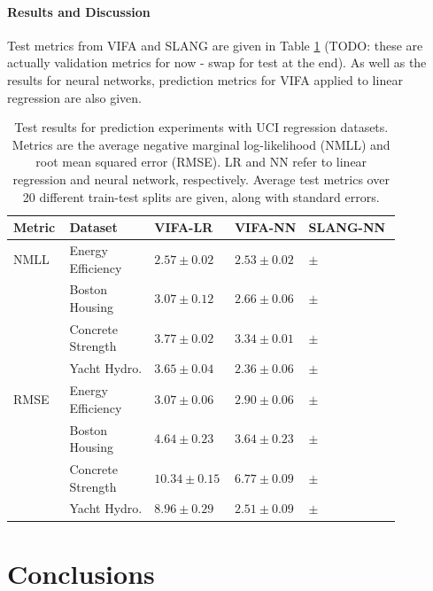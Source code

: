 \documentclass[msc,deptreport.inf]{infthesis} %
\begin{document}
\subsubsection{Results and Discussion} 

Test metrics from VIFA and SLANG are given in Table \ref{table:neural_nets_uci} (TODO: these are actually validation metrics for now - swap for test at the end). As well as the results for neural networks, prediction metrics for VIFA applied to linear regression are also given. 

\begin{table}[h!]
	\begin{center}
		\begin{tabular}{|| p{0.13\linewidth} p{0.21\linewidth} p{0.15\linewidth} p{0.15\linewidth} p{0.23\linewidth} ||} 
 			\hline
 			Metric & Dataset & VIFA-LR & VIFA-NN & SLANG-NN \\ [0.5ex] 
 			\hline\hline
			NMLL 	& Energy Efficiency 	& $2.57 \pm 0.02$  	& $2.53 \pm 0.02$ 	& $ \pm $ \\ 
					& Boston Housing 	& $3.07 \pm 0.12$ 	& $2.66 \pm 0.06$ 	& $ \pm $ \\ 
					& Concrete Strength & $3.77 \pm 0.02$ 	& $3.34 \pm 0.01$ 	& $ \pm $ \\ 
 					& Yacht Hydro. 		& $3.65 \pm 0.04$ 	& $2.36 \pm 0.06$ 	& $ \pm $ \\
 			\hline
			RMSE 	& Energy Efficiency 	& $3.07 \pm 0.06$  	& $2.90 \pm 0.06$ 	& $ \pm $ \\ 
					& Boston Housing 	& $4.64 \pm 0.23$ 	& $3.64 \pm 0.23$ 	& $ \pm $ \\ 
					& Concrete Strength & $10.34 \pm 0.15$ 	& $6.77 \pm 0.09$ 	& $ \pm $ \\ 
 					& Yacht Hydro. 		& $8.96 \pm 0.29$ 	& $2.51 \pm 0.09$ 	& $ \pm $ 
					\\ [1ex] 
			\hline
		\end{tabular}
		\caption{Test results for prediction experiments with UCI regression datasets. Metrics are the average negative marginal log-likelihood (NMLL) and root mean squared error (RMSE). LR and NN refer to linear regression and neural network, respectively. Average test metrics over 20 different train-test splits are given, along with standard errors.}
		\label{table:neural_nets_uci}
	\end{center}
\end{table}



\chapter{Conclusions}
\end{document}
